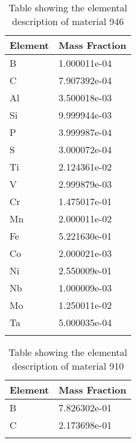 \begin{centering}
\begin{longtable}[ht!]
\caption{Table showing the elemental description of material M303}
\label{table:material_M303}
\end{longtable}
\clearpage
\begin{longtable}[ht!]
{ p{} | p{} }
\hline
Element & Mass Fraction\\
\hline
B &  1.000011e-04\\
C &  7.907392e-04\\
Al &  3.500018e-03\\
Si &  9.999944e-03\\
P &  3.999987e-04\\
S &  3.000072e-04\\
Ti &  2.124361e-02\\
V &  2.999879e-03\\
Cr &  1.475017e-01\\
Mn &  2.000011e-02\\
Fe &  5.221630e-01\\
Co &  2.000021e-03\\
Ni &  2.550009e-01\\
Nb &  1.000009e-03\\
Mo &  1.250011e-02\\
Ta &  5.000035e-04\\
\caption{Table showing the elemental description of material 946}
\label{table:material_EPPCH}
\end{longtable}
\clearpage

\begin{longtable}[ht!]
{ p{} | p{} }
\hline
Element & Mass Fraction\\
\hline
B &  7.826302e-01\\
C &  2.173698e-01\\
\caption{Table showing the elemental description of material 910}
\label{table:material_B4C}
\end{longtable}
\clearpage


\end{centering}
